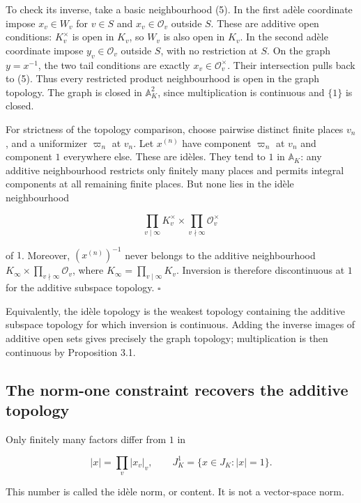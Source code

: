 \documentclass[
  english,
  11pt,
  a4paper,
]{article}
\newcounter{none} %
\begin{document}
To check its inverse, take a basic neighbourhood (5). In the first adèle
coordinate impose \(x_v\in W_v\) for \(v\in S\) and
\(x_v\in\mathcal O_v\) outside \(S\). These are additive open
conditions: \(K_v^\times\) is open in \(K_v\), so \(W_v\) is also open
in \(K_v\). In the second adèle coordinate impose \(y_v\in\mathcal O_v\)
outside \(S\), with no restriction at \(S\). On the graph \(y=x^{-1}\),
the two tail conditions are exactly \(x_v\in\mathcal O_v^\times\). Their
intersection pulls back to (5). Thus every restricted product
neighbourhood is open in the graph topology. The graph is closed in
\(\mathbb A_K^2\), since multiplication is continuous and \(\{1\}\) is
closed.

For strictness of the topology comparison, choose pairwise distinct
finite places \(v_n\), and a uniformizer \(\varpi_n\) at \(v_n\). Let
\(x^{(n)}\) have component \(\varpi_n\) at \(v_n\) and component \(1\)
everywhere else. These are idèles. They tend to \(1\) in
\(\mathbb A_K\): any additive neighbourhood restricts only finitely many
places and permits integral components at all remaining finite places.
But none lies in the idèle neighbourhood

\[\prod_{v\mid\infty}K_v^\times\times\prod_{v\nmid\infty}\mathcal O_v^\times
\tag{7}\]

of \(1\). Moreover, \((x^{(n)})^{-1}\) never belongs to the additive
neighbourhood \(K_\infty\times\prod_{v\nmid\infty}\mathcal O_v\), where
\(K_\infty=\prod_{v\mid\infty}K_v\). Inversion is therefore
discontinuous at \(1\) for the additive subspace topology. \(\square\)

Equivalently, the idèle topology is the weakest topology containing the
additive subspace topology for which inversion is continuous. Adding the
inverse images of additive open sets gives precisely the graph topology;
multiplication is then continuous by Proposition 3.1.

\subsection{The norm-one constraint recovers the additive
topology}\label{NT-ADL-03--the-norm-one-constraint-recovers-the-additive-topology}

Only finitely many factors differ from \(1\) in

\[|x|=\prod_v|x_v|_v,
\qquad J_K^1=\{x\in J_K:|x|=1\}.
\tag{8}\]

This number is called the idèle norm, or content. It is not a
vector-space norm.
\end{document}
